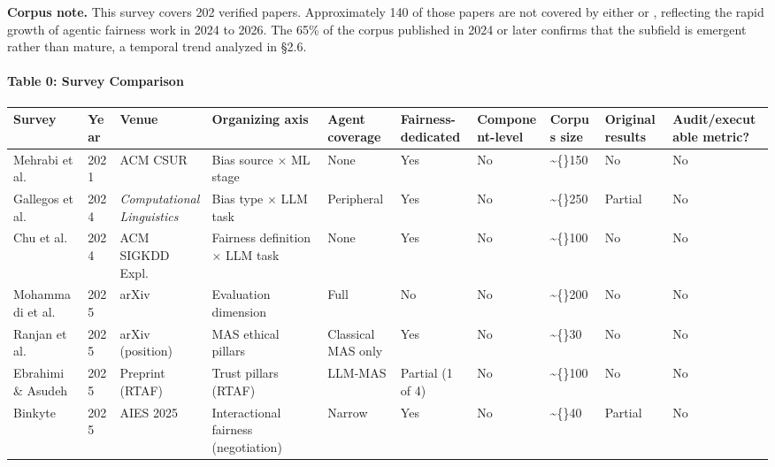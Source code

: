 \documentclass[10pt]{article}
\begin{document}
\textbf{Corpus note.} This survey covers 202 verified papers. Approximately 140 of those papers are not covered by either \cite{gallegos2024bias} or \cite{chu2024fairness}, reflecting the rapid growth of agentic fairness work in 2024 to 2026. The 65\% of the corpus published in 2024 or later confirms that the subfield is emergent rather than mature, a temporal trend analyzed in \S{}2.6.


\paragraph*{Table 0: Survey Comparison}

\begin{center}\footnotesize
\begin{longtable}{|p{}|p{}|p{}|p{}|p{}|p{}|p{}|p{}|p{}|p{}|}
\hline \textbf{Survey} & \textbf{Year} & \textbf{Venue} & \textbf{Organizing axis} & \textbf{Agent coverage} & \textbf{Fairness-dedicated} & \textbf{Component-level} & \textbf{Corpus size} & \textbf{Original results} & \textbf{Audit/executable metric?} \\ \hline\endhead
Mehrabi et al. \cite{mehrabi2021survey} & 2021 & ACM CSUR & Bias source $\times$ ML stage & None & Yes & No & \textasciitilde\{\}150 & No & No \\ \hline
Gallegos et al. \cite{gallegos2024bias} & 2024 & \emph{Computational Linguistics} & Bias type $\times$ LLM task & Peripheral & Yes & No & \textasciitilde\{\}250 & Partial & No \\ \hline
Chu et al. \cite{chu2024fairness} & 2024 & ACM SIGKDD Expl. & Fairness definition $\times$ LLM task & None & Yes & No & \textasciitilde\{\}100 & No & No \\ \hline
Mohammadi et al. \cite{mohammadi2025evaluation} & 2025 & arXiv & Evaluation dimension & Full & No & No & \textasciitilde\{\}200 & No & No \\ \hline
Ranjan et al. \cite{ranjan2025fairness} & 2025 & arXiv (position) & MAS ethical pillars & Classical MAS only & Yes & No & \textasciitilde\{\}30 & No & No \\ \hline
Ebrahimi \& Asudeh \cite{ebrahimi2025survey} & 2025 & Preprint (RTAF) & Trust pillars (RTAF) & LLM-MAS & Partial (1 of 4) & No & \textasciitilde\{\}100 & No & No \\ \hline
Binkyte \cite{binkyte2025interactional} & 2025 & AIES 2025 & Interactional fairness (negotiation) & Narrow & Yes & No & \textasciitilde\{\}40 & Partial & No \\ \hline

\end{longtable}
\end{center}
\end{document}
